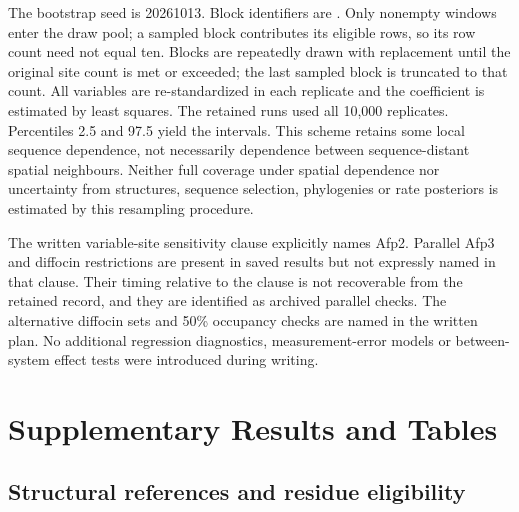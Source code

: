 The bootstrap seed is 20261013. Block identifiers are . Only nonempty windows enter the draw pool; a sampled block contributes its eligible rows, so its row count need not equal ten. Blocks are repeatedly drawn with replacement until the original site count is met or exceeded; the last sampled block is truncated to that count. All variables are re-standardized in each replicate and the coefficient is estimated by least squares. The retained runs used all 10,000 replicates. Percentiles 2.5 and 97.5 yield the intervals. This scheme retains some local sequence dependence, not necessarily dependence between sequence-distant spatial neighbours. Neither full coverage under spatial dependence nor uncertainty from structures, sequence selection, phylogenies or rate posteriors is estimated by this resampling procedure.

The written variable-site sensitivity clause explicitly names Afp2. Parallel Afp3 and diffocin restrictions are present in saved results but not expressly named in that clause. Their timing relative to the clause is not recoverable from the retained record, and they are identified as archived parallel checks. The alternative diffocin sets and 50\% occupancy checks are named in the written plan. No additional regression diagnostics, measurement-error models or between-system effect tests were introduced during writing.

\section{Supplementary Results and Tables}

\subsection{Structural references and residue eligibility}

